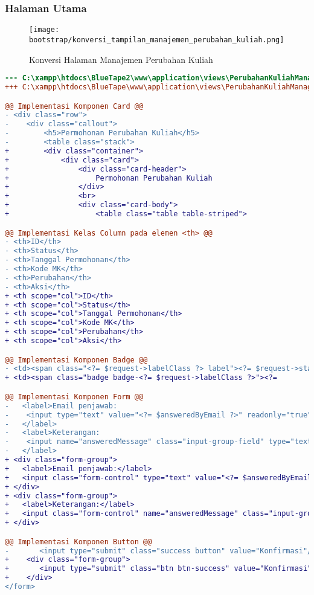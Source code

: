\subsubsection{Halaman Utama}
\begin{figure} [H]
	\centering  
	\texttt{[image: bootstrap/konversi\_tampilan\_manajemen\_perubahan\_kuliah.png]}
	\caption{Konversi Halaman Manajemen Perubahan Kuliah}
\end{figure}
\begin{lstlisting}[language=diff, caption=Kode untuk Halaman Manajemen Perubahan Kuliah, label=Entri, basicstyle=\ttfamily, frame=single,
columns=fullflexible, keepspaces=true, breaklines=true]
--- C:\xampp\htdocs\BlueTape2\www\application\views\PerubahanKuliahManage\main.php
+++ C:\xampp\htdocs\BlueTape\www\application\views\PerubahanKuliahManage\main.php00

@@ Implementasi Komponen Card @@
- <div class="row">
-    <div class="callout">
-        <h5>Permohonan Perubahan Kuliah</h5>
-        <table class="stack">
+        <div class="container">
+            <div class="card">
+                <div class="card-header">
+                    Permohonan Perubahan Kuliah
+                </div>
+                <br>
+                <div class="card-body">
+                    <table class="table table-striped">

@@ Implementasi Kelas Column pada elemen <th> @@
- <th>ID</th>
- <th>Status</th>
- <th>Tanggal Permohonan</th>
- <th>Kode MK</th>
- <th>Perubahan</th>
- <th>Aksi</th>
+ <th scope="col">ID</th>
+ <th scope="col">Status</th>
+ <th scope="col">Tanggal Permohonan</th>
+ <th scope="col">Kode MK</th>
+ <th scope="col">Perubahan</th>
+ <th scope="col">Aksi</th>

@@ Implementasi Komponen Badge @@
- <td><span class="<?= $request->labelClass ?> label"><?= $request->status ?></span></td>
+ <td><span class="badge badge-<?= $request->labelClass ?>"><?= 

@@ Implementasi Komponen Form @@
-   <label>Email penjawab:
-    <input type="text" value="<?= $answeredByEmail ?>" readonly="true"/>
-   </label>
-   <label>Keterangan:
-    <input name="answeredMessage" class="input-group-field" type="text"/>
-   </label>
+ <div class="form-group">
+   <label>Email penjawab:</label>
+   <input class="form-control" type="text" value="<?= $answeredByEmail ?>" readonly="true"/>
+ </div>
+ <div class="form-group">
+   <label>Keterangan:</label>
+   <input class="form-control" name="answeredMessage" class="input-group-field" type="text"/>
+ </div>

@@ Implementasi Komponen Button @@                                            
-    	<input type="submit" class="success button" value="Konfirmasi"/>
+    <div class="form-group">
+       <input type="submit" class="btn btn-success" value="Konfirmasi"/>
+    </div>
</form>
\end{lstlisting}

